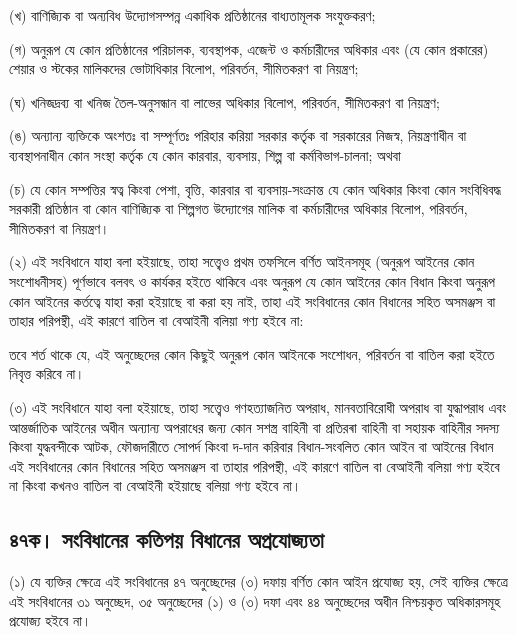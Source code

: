 \documentclass[11pt]{article}
\begin{document}
(খ) বাণিজ্যিক বা অন্যবিধ উদ্যোগসম্পন্ন একাধিক প্রতিষ্ঠানের বাধ্যতামূলক
    সংযুক্তকরণ;

(গ) অনুরূপ যে কোন প্রতিষ্ঠানের পরিচালক, ব্যবস্থাপক, এজেন্ট ও কর্মচারীদের
    অধিকার এবং (যে কোন প্রকারের) শেয়ার ও স্টকের মালিকদের ভোটাধিকার বিলোপ,
    পরিবর্তন, সীমিতকরণ বা নিয়ন্ত্রণ;

(ঘ) খনিজদ্রব্য বা খনিজ তৈল-অনুসন্ধান বা লাভের অধিকার বিলোপ, পরিবর্তন,
    সীমিতকরণ বা নিয়ন্ত্রণ;

(ঙ) অন্যান্য ব্যক্তিকে অংশতঃ বা সম্পূর্ণতঃ পরিহার করিয়া সরকার কর্তৃক বা সরকারের
    নিজস্ব, নিয়ন্ত্রণাধীন বা ব্যবস্থাপনাধীন কোন সংস্থা কর্তৃক যে কোন কারবার,
    ব্যবসায়, শিল্প বা কর্মবিভাগ-চালনা; অথবা

(চ) যে কোন সম্পত্তির স্বত্ব কিংবা পেশা, বৃত্তি, কারবার বা ব্যবসায়-সংক্রান্ত যে
    কোন অধিকার কিংবা কোন সংবিধিবদ্ধ সরকারী প্রতিষ্ঠান বা কোন বাণিজ্যিক বা
    শিল্পগত উদ্যোগের মালিক বা কর্মচারীদের অধিকার বিলোপ, পরিবর্তন, সীমিতকরণ বা
    নিয়ন্ত্রণ।

(২) এই সংবিধানে যাহা বলা হইয়াছে, তাহা সত্ত্বেও প্রথম তফসিলে বর্ণিত আইনসমূহ
    (অনুরূপ আইনের কোন সংশোধনীসহ) পূর্ণভাবে বলবৎ ও কার্যকর হইতে থাকিবে এবং অনুরূপ
    যে কোন আইনের কোন বিধান কিংবা অনুরূপ কোন আইনের কর্তত্বে যাহা করা হইয়াছে বা
    করা হয় নাই, তাহা এই সংবিধানের কোন বিধানের সহিত অসমঞ্জস বা তাহার
    পরিপন্থী, এই কারণে বাতিল বা বেআইনী বলিয়া গণ্য হইবে না:

 তবে শর্ত থাকে যে, এই অনুচ্ছেদের কোন কিছুই অনুরূপ কোন আইনকে সংশোধন,
পরিবর্তন বা বাতিল করা হইতে নিবৃত্ত করিবে না।

(৩) এই সংবিধানে যাহা বলা হইয়াছে, তাহা সত্ত্বেও গণহত্যাজনিত অপরাধ,
    মানবতাবিরোধী অপরাধ বা যুদ্ধাপরাধ এবং আন্তর্জাতিক আইনের অধীন অন্যান্য অপরাধের
    জন্য কোন সশস্ত্র বাহিনী বা প্রতিরৰা বাহিনী বা সহায়ক বাহিনীর সদস্য কিংবা
    যুদ্ধবন্দীকে আটক, ফৌজদারীতে সোপর্দ কিংবা দ-দান করিবার বিধান-সংবলিত কোন
    আইন বা আইনের বিধান এই সংবিধানের কোন বিধানের সহিত অসমঞ্জস বা তাহার
    পরিপন্থী, এই কারণে বাতিল বা বেআইনী বলিয়া গণ্য হইবে না কিংবা কখনও বাতিল
    বা বেআইনী হইয়াছে বলিয়া গণ্য হইবে না।

\subsection{৪৭ক। সংবিধানের কতিপয় বিধানের অপ্রযোজ্যতা}
\label{sec:org5f24d36}
(১) যে ব্যক্তির ক্ষেত্রে এই সংবিধানের ৪৭ অনুচ্ছেদের (৩) দফায় বর্ণিত কোন আইন
    প্রযোজ্য হয়, সেই ব্যক্তির ক্ষেত্রে এই সংবিধানের ৩১ অনুচ্ছেদ, ৩৫ অনুচ্ছেদের (১) ও
    (৩) দফা এবং ৪৪ অনুচ্ছেদের অধীন নিশ্চয়কৃত অধিকারসমূহ প্রযোজ্য হইবে না।
\end{document}

